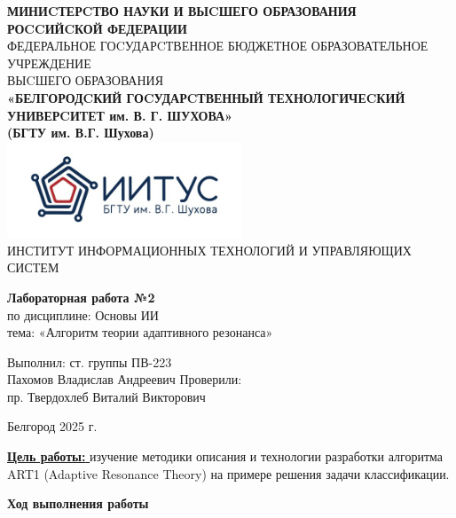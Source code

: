 \documentclass[a4paper,14pt]{extarticle}
\newcommand\textbox[1]{
	\parbox{.45\textwidth}{#1}
}
\begin{document}
\begin{center}
    \small{
        \textbf{МИНИCТЕРCТВО НАУКИ И ВЫCШЕГО ОБРАЗОВАНИЯ РОCCИЙCКОЙ ФЕДЕРАЦИИ}\\
        ФЕДЕРАЛЬНОЕ ГОCУДАРCТВЕННОЕ БЮДЖЕТНОЕ ОБРАЗОВАТЕЛЬНОЕ УЧРЕЖДЕНИЕ\\ВЫCШЕГО ОБРАЗОВАНИЯ \\
        \textbf{«БЕЛГОРОДCКИЙ ГОCУДАРCТВЕННЫЙ ТЕХНОЛОГИЧЕCКИЙ\\УНИВЕРCИТЕТ им. В. Г. ШУХОВА»\\ (БГТУ им. В.Г. Шухова)} \\
        \bigbreak
        \includegraphics[width=70mm]{log}\\
        ИНСТИТУТ ИНФОРМАЦИОННЫХ ТЕХНОЛОГИЙ И УПРАВЛЯЮЩИХ СИСТЕМ\\}
\end{center}

\vfill
\begin{center}
    \large{
        \textbf{
            Лабораторная работа №2}}\\
    \normalsize{
        по дисциплине: Основы ИИ \\
        тема: «Алгоритм теории адаптивного резонанса»}
\end{center}
\vfill
\hfill\textbox{
    Выполнил: ст. группы ПВ-223\\Пахомов Владислав Андреевич
    \bigbreak
    Проверили: \\пр. Твердохлеб Виталий Викторович
}
\vfill\begin{center}
    Белгород 2025 г.
\end{center}
\newpage
\underline{\textbf{Цель работы: }}изучение методики описания и технологии разработки
алгоритма ART1 (Adaptive Resonance Theory) на примере решения задачи
классификации.\\
\begin{center}
\textbf{Ход выполнения работы}
\end{center}
\end{document}
